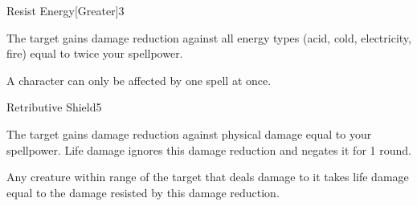 \begin{spellsection}{Resist Energy}[Greater]{3}
    \begin{spellheader}
    \end{spellheader}
    \begin{spellcontent}
        \begin{spelltargetinginfo}
        \end{spelltargetinginfo}
        \begin{spelleffects}
            \spelleffect The target gains damage reduction against all energy types (acid, cold, electricity, fire) equal to twice your spellpower.
            \spelldur \durpersonallong
        \end{spelleffects}
    \end{spellcontent}
    \begin{spellfooter}
        \spellnotes A character can only be affected by one  spell at once.
        \miscastexplode
    \end{spellfooter}
\end{spellsection}

\begin{spellsection}{Retributive Shield}{5}
    \begin{spellheader}
    \end{spellheader}
    \begin{spellcontent}
        \begin{spelltargetinginfo}
        \end{spelltargetinginfo}
        \begin{spelleffects}
            \spelleffect The target gains damage reduction against physical damage equal to your spellpower. Life damage ignores this damage reduction and negates it for 1 round.

            \par Any creature within \rngmed range of the target that deals damage to it takes life damage equal to the damage resisted by this damage reduction.
            \spelldur \durshort
        \end{spelleffects}
    \end{spellcontent}
    \begin{spellfooter}
        \miscastrandom
    \end{spellfooter}
\end{spellsection}

